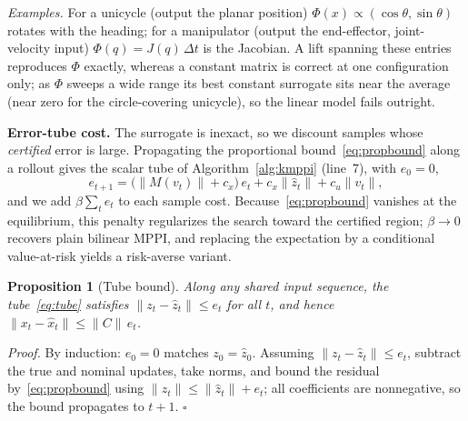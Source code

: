 \documentclass[lettersize,journal]{IEEEtran}
\newtheorem{proposition}{Proposition}
\theoremstyle{remark}
\begin{document}
\emph{Examples.}
For a unicycle (output the planar position) $\Phi(x)\!\propto\!(\cos\theta,\sin\theta)$ rotates with the heading; for a manipulator (output the end-effector, joint-velocity input) $\Phi(q)=J(q)\,\Delta t$ is the Jacobian.
A lift spanning these entries reproduces $\Phi$ exactly, whereas a constant matrix is correct at one configuration only; as $\Phi$ sweeps a wide range its best constant surrogate sits near the average (near zero for the circle-covering unicycle), so the linear model fails outright.

\textbf{Error-tube cost.}
The surrogate is inexact, so we discount samples whose \emph{certified} error is large.
Propagating the proportional bound~\eqref{eq:propbound} along a rollout gives the scalar tube of Algorithm~\ref{alg:kmppi} (line~7), with $e_0=0$,
\begin{equation}\label{eq:tube}
e_{t+1} = \big(\|M(v_t)\|+c_x\big)\,e_t + c_x\|\hat z_t\| + c_u\|v_t\|,
\end{equation}
and we add $\beta\sum_t e_t$ to each sample cost.
Because~\eqref{eq:propbound} vanishes at the equilibrium, this penalty regularizes the search toward the certified region; $\beta\to0$ recovers plain bilinear MPPI, and replacing the expectation by a conditional value-at-risk yields a risk-averse variant.

\begin{proposition}[Tube bound]\label{prop:tube}
Along any shared input sequence, the tube~\eqref{eq:tube} satisfies $\|z_t-\hat z_t\|\le e_t$ for all $t$, and hence $\|x_t-\hat x_t\|\le\|C\|\,e_t$.
\end{proposition}
\noindent\emph{Proof.}
By induction: $e_0=0$ matches $z_0=\hat z_0$.
Assuming $\|z_t-\hat z_t\|\le e_t$, subtract the true and nominal updates, take norms, and bound the residual by~\eqref{eq:propbound} using $\|z_t\|\le\|\hat z_t\|+e_t$; all coefficients are nonnegative, so the bound propagates to $t{+}1$. \hfill$\square$
\end{document}
